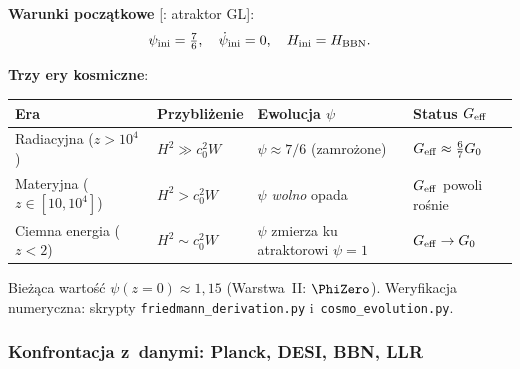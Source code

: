 \begin{proposition}
\medskip\noindent
\textbf{Warunki pocz\k{a}tkowe} [: atraktor GL]:
\begin{equation}\label{eq:ic-cosmo}
  \psi_{\rm ini} = \tfrac{7}{6},\quad
  \dot\psi_{\rm ini} = 0,\quad
  H_{\rm ini} = H_{\rm BBN}.
\end{equation}

\medskip\noindent
\textbf{Trzy ery kosmiczne}:
\begin{center}\footnotesize
\begin{tabular}{@{}llll@{}}
\toprule
\textbf{Era} & \textbf{Przybli\.zenie} & \textbf{Ewolucja $\psi$}
  & \textbf{Status $G_{\rm eff}$} \\
\midrule
Radiacyjna ($z > 10^4$)
  & $H^2 \gg c_0^2 W$
  & $\psi \approx 7/6$ (zamro\.zone)
  & $G_{\rm eff} \approx \frac{6}{7}G_0$ \\[3pt]
Materyjna ($z \in [10, 10^4]$)
  & $H^2 > c_0^2 W$
  & $\psi$ \emph{wolno} opada
  & $G_{\rm eff}$ powoli ro\'snie \\[3pt]
Ciemna energia ($z < 2$)
  & $H^2 \sim c_0^2 W$
  & $\psi$ zmierza ku atraktorowi $\psi = 1$
  & $G_{\rm eff} \to G_0$ \\
\bottomrule
\end{tabular}
\end{center}

Bie\.z\k{a}ca warto\'s\'c $\psi(z=0) \approx 1{,}15$ (Warstwa~II: $\PhiZero$).
Weryfikacja numeryczna: skrypty \texttt{friedmann\_derivation.py}
i~\texttt{cosmo\_evolution.py}.
\end{proposition}

\subsubsection{Konfrontacja z~danymi: Planck, DESI, BBN, LLR}%
\label{sssec:cosmo-data-confrontation}

